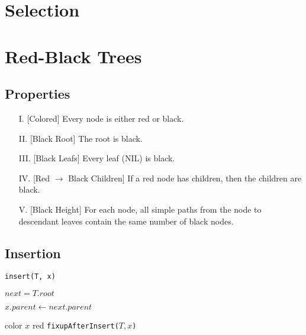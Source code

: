 \documentclass{article}
\begin{document}
\section{Selection}


\section{Red-Black Trees}

\subsection{Properties}
\begin{itemize}
  \item[I.]\label{properties:1} [Colored] Every node is either red or black.
  \item[II.]\label{properties:2} [Black Root] The root is black.
  \item[III.]\label{properties:3} [Black Leafs] Every leaf (NIL) is black.
  \item[IV.]\label{properties:4} [Red $\to$ Black Children] If a red node has children, then the children are black.
  \item[V.]\label{properties:5} [Black Height] For each node, all simple paths from the node to descendant leaves contain the same number of black nodes.
\end{itemize}

\subsection{Insertion}

\begin{algorithm}[H]
  \caption{\texttt{insert(T, x)}}

  \BlankLine

  $next = T.root$\;

  $x.parent \gets next.parent$\;

  color $x$ red\;
  \texttt{fixupAfterInsert($T, x$)}\;
\end{algorithm}
\end{document}
